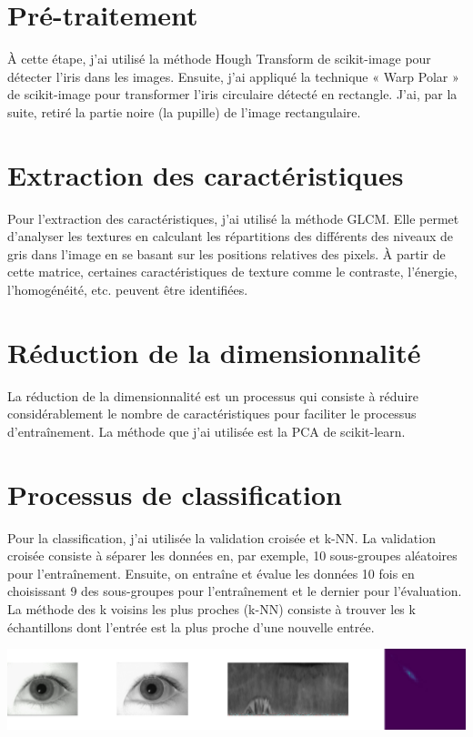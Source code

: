 {{	\section{Pré-traitement}
	À cette étape, j'ai utilisé la méthode Hough Transform de scikit-image pour détecter l'iris dans les images. Ensuite, j'ai appliqué la technique « Warp Polar » de scikit-image pour transformer l'iris circulaire détecté en rectangle.\cite{ref_4} J'ai, par la suite, retiré la partie noire (la pupille) de l’image rectangulaire.
	
	
	\section{Extraction des caractéristiques}
	Pour l'extraction des caractéristiques, j'ai utilisé la méthode GLCM. Elle permet d'analyser les textures en calculant les répartitions des différents des niveaux de gris dans l'image en se basant sur les positions relatives des pixels. À partir de cette matrice, certaines caractéristiques de texture comme le contraste, l'énergie, l'homogénéité, etc. peuvent être identifiées.\cite{ref_5}
	
	\section{Réduction de la dimensionnalité}
	La réduction de la dimensionnalité est un processus qui consiste à réduire considérablement le nombre de caractéristiques pour faciliter le processus d’entraînement.\cite{ref_1} La méthode que j'ai utilisée est la PCA de scikit-learn.
	
	\section{Processus de classification}
    Pour la classification, j'ai utilisée la validation croisée et k-NN. La validation croisée consiste à séparer les données en, par exemple, 10 sous-groupes aléatoires pour l’entraînement. Ensuite, on entraîne et évalue les données 10 fois en choisissant 9 des sous-groupes pour l’entraînement et le dernier pour l’évaluation.\cite{ref_1} La méthode des k voisins les plus proches (k-NN) consiste à trouver les k échantillons dont l’entrée est la plus proche d’une nouvelle entrée.
    
    \vspace{1em}
    \begin{center}
        \includegraphics[width=0.9\linewidth]{processus}
    \end{center}
    \vspace{1em}
    
	}
}